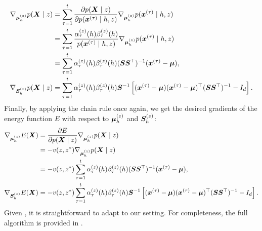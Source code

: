 \begin{align}
\nabla_{{\bm{\mu}}^{(z)}_h} p({\bm{X}} \mid z) &= \sum_{\tau=1}^t \frac{\partial p({\bm{X}} \mid z)}{\partial p({\bm{x}}^{(\tau)} \mid h, z)} \nabla_{{\bm{\mu}}^{(z)}_h} p({\bm{x}}^{(\tau)} \mid h, z) \nonumber\\
&= \sum_{\tau=1}^t \frac{\alpha_{\tau}^{(z)}(h) \beta_{\tau}^{(z)}(h)}{p({\bm{x}}^{(\tau)} \mid h, z)} \nabla_{{\bm{\mu}}^{(z)}_h} p({\bm{x}}^{(\tau)} \mid h, z) \nonumber\\
&= \sum_{\tau=1}^t \alpha_{\tau}^{(z)}(h) \beta_{\tau}^{(z)}(h) ({\bm{S}} {\bm{S}} ^\top)^{-1} ({\bm{x}}^{(\tau)} - {\bm{\mu}}), \\
\nabla_{{\bm{S}}^{(z)}_h} p({\bm{X}} \mid z) &= \sum_{\tau=1}^t \alpha_{\tau}^{(z)}(h) \beta_{\tau}^{(z)}(h) {\bm{S}}^{-1} \left[ ({\bm{x}}^{(\tau)} - {\bm{\mu}}) ({\bm{x}}^{(\tau)} - {\bm{\mu}})^\top ({\bm{S}} {\bm{S}} ^\top)^{-1} - I_d\right].
\end{align}
Finally, by applying the chain rule once again, we get the desired gradients of the energy function $E$ with respect to ${\bm{\mu}}^{(z)}_h$ and ${\bm{S}}^{(z)}_h$:
\begin{align}
\nabla_{{\bm{\mu}}^{(z)}_h} E({\bm{X}}) &= \frac{\partial E}{\partial p({\bm{X}} \mid z)} \nabla_{{\bm{\mu}}^{(z)}_h} p({\bm{X}} \mid z) \nonumber\\
&= -v(z, z^*) \nabla_{{\bm{\mu}}^{(z)}_h} p({\bm{X}} \mid z) \nonumber\\
&= -v(z, z^*) \sum_{\tau=1}^t \alpha_{\tau}^{(z)}(h) \beta_{\tau}^{(z)}(h) ({\bm{S}} {\bm{S}} ^\top)^{-1} ({\bm{x}}^{(\tau)} - {\bm{\mu}}), \label{eq:sohmmm_grad_mu}\\
\nabla_{{\bm{S}}^{(z)}_h} E({\bm{X}}) &= -v(z, z^*) \sum_{\tau=1}^t \alpha_{\tau}^{(z)}(h) \beta_{\tau}^{(z)}(h) {\bm{S}}^{-1} \left[ ({\bm{x}}^{(\tau)} - {\bm{\mu}}) ({\bm{x}}^{(\tau)} - {\bm{\mu}})^\top ({\bm{S}} {\bm{S}} ^\top)^{-1} - I_d\right]. \label{eq:sohmmm_grad_s}
\end{align}
Given , it is straightforward to adapt  to our setting. For completeness, the full algorithm is provided in .

